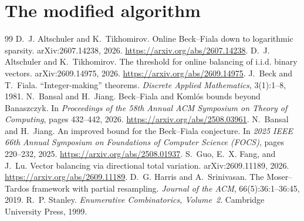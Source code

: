 \documentclass[10pt,a4paper]{amsart}
\begin{document}
\section{The modified algorithm}\label{sec:joint}


\begin{thebibliography}{99}
 D.~J. Altschuler and K.~Tikhomirov. \newblock Online Beck--Fiala down to logarithmic sparsity. \newblock arXiv:2607.14238, 2026. \newblock \url{https://arxiv.org/abs/2607.14238}.
 D.~J. Altschuler and K.~Tikhomirov. \newblock The threshold for online balancing of i.i.d. binary vectors. \newblock arXiv:2609.14975, 2026. \newblock \url{https://arxiv.org/abs/2609.14975}.
 J.~Beck and T.~Fiala. \newblock ``Integer-making'' theorems. \newblock \emph{Discrete Applied Mathematics}, 3(1):1--8, 1981.
 N.~Bansal and H.~Jiang. \newblock Beck--Fiala and Koml\'os bounds beyond Banaszczyk. \newblock In \emph{Proceedings of the 58th Annual ACM Symposium on Theory of Computing}, pages 432--442, 2026. \newblock \url{https://arxiv.org/abs/2508.03961}.
 N.~Bansal and H.~Jiang. \newblock An improved bound for the Beck--Fiala conjecture. \newblock In \emph{2025 IEEE 66th Annual Symposium on Foundations of Computer Science (FOCS)}, pages 220--232, 2025. \newblock \url{https://arxiv.org/abs/2508.01937}.
 S.~Guo, E.~X. Fang, and J.~Lu. \newblock Vector balancing via directional total variation. \newblock arXiv:2609.11189, 2026. \newblock \url{https://arxiv.org/abs/2609.11189}.
 D.~G. Harris and A.~Srinivasan. \newblock The Moser--Tardos framework with partial resampling. \newblock \emph{Journal of the ACM}, 66(5):36:1--36:45, 2019.
 R.~P. Stanley. \emph{Enumerative Combinatorics, Volume~2}. Cambridge University Press, 1999.
\end{thebibliography}
\end{document}
